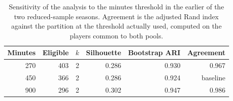 \begin{table}[t]
\centering
\small
\caption{Sensitivity of the analysis to the minutes threshold in the earlier of the two reduced-sample seasons. Agreement is the adjusted Rand index against the partition at the threshold actually used, computed on the players common to both pools.}
\label{tab:sensitivity}
\begin{tabular}{rrrrrr}
\toprule
Minutes & Eligible & $k$ & Silhouette & Bootstrap ARI & Agreement \\
\midrule
270 & 403 & 2 & 0.286 & 0.930 & 0.967 \\
450 & 366 & 2 & 0.286 & 0.924 & baseline \\
900 & 296 & 2 & 0.302 & 0.947 & 0.986 \\
\bottomrule
\end{tabular}
\end{table}
